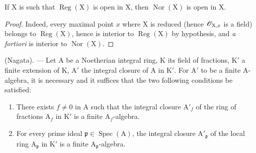 \begin{corollary}[6.13.5]
\label{IV.6.13.5}
If $\mathrm{X}$ is such that $\operatorname{Reg}(\mathrm{X})$ is open in $\mathrm{X}$, then $\operatorname{Nor}(\mathrm{X})$ is
open in $\mathrm{X}$.
\end{corollary}

\begin{proof}
Indeed, every maximal point $x$ where $\mathrm{X}$ is reduced (hence $\mathscr{O}_{\mathrm{X},x}$ is a field) belongs
to $\operatorname{Reg}(\mathrm{X})$, hence is interior to $\operatorname{Reg}(\mathrm{X})$ by hypothesis, and \emph{a fortiori} is interior to $\operatorname{Nor}(\mathrm{X})$.
\end{proof}

\begin{proposition}[6.13.6]
\label{IV.6.13.6}
\textnormal{(Nagata).} --- Let $\mathrm{A}$ be a Noetherian integral ring, $\mathrm{K}$ its field of
fractions, $\mathrm{K}'$ a finite extension of $\mathrm{K}$, $\mathrm{A}'$ the integral closure of $\mathrm{A}$ in $\mathrm{K}'$. For $\mathrm{A}'$
to be a finite $\mathrm{A}$-algebra, it is necessary and it suffices that the two following conditions be satisfied:
\begin{enumerate}[label=\textup{(\roman*)}]
  \item There exists $f\neq 0$ in $\mathrm{A}$ such that the integral closure $\mathrm{A}'_f$ of the ring of fractions $\mathrm{A}_f$
in $\mathrm{K}'$ is a finite $\mathrm{A}_f$-algebra.
  \item For every prime ideal $\mathfrak{p}\in\operatorname{Spec}(\mathrm{A})$, the integral closure $\mathrm{A}'_\mathfrak{p}$ of the local ring $\mathrm{A}_\mathfrak{p}$
in $\mathrm{K}'$ is a finite $\mathrm{A}_\mathfrak{p}$-algebra.
\end{enumerate}
\end{proposition}

